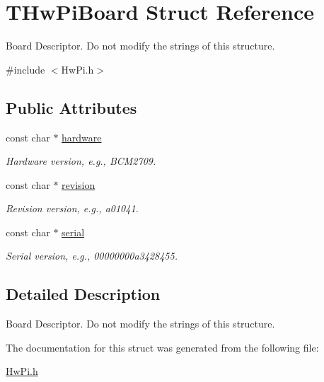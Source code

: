 \hypertarget{structTHwPiBoard}{}\section{T\+Hw\+Pi\+Board Struct Reference}
\label{structTHwPiBoard}


Board Descriptor. Do not modify the strings of this structure.  




{\ttfamily \#include $<$Hw\+Pi.\+h$>$}

\subsection*{Public Attributes}
\begin{DoxyCompactItemize}
\item 
\mbox{\label{structTHwPiBoard_a32e53d11dccfac9ae28822debd28ef62}} 
const char $\ast$ \hyperlink{structTHwPiBoard_a32e53d11dccfac9ae28822debd28ef62}{hardware}
\begin{DoxyCompactList}\small\item\em Hardware version, e.\+g., B\+C\+M2709. \end{DoxyCompactList}\item 
\mbox{\label{structTHwPiBoard_abe65312b7ce78d83e1ad5a6ff9df38af}} 
const char $\ast$ \hyperlink{structTHwPiBoard_abe65312b7ce78d83e1ad5a6ff9df38af}{revision}
\begin{DoxyCompactList}\small\item\em Revision version, e.\+g., a01041. \end{DoxyCompactList}\item 
\mbox{\label{structTHwPiBoard_af2aef80ffd1eaafb84b486f5d65af706}} 
const char $\ast$ \hyperlink{structTHwPiBoard_af2aef80ffd1eaafb84b486f5d65af706}{serial}
\begin{DoxyCompactList}\small\item\em Serial version, e.\+g., 00000000a3428455. \end{DoxyCompactList}\end{DoxyCompactItemize}


\subsection{Detailed Description}
Board Descriptor. Do not modify the strings of this structure. 

The documentation for this struct was generated from the following file\+:\begin{DoxyCompactItemize}
\item 
\hyperlink{HwPi_8h}{Hw\+Pi.\+h}\end{DoxyCompactItemize}

